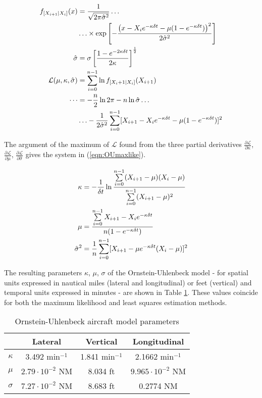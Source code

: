 \documentclass[conference]{IEEEtran}
\begin{document}
\begin{align}
f_{[X_{i+1}|X_i]}(x)&=\frac{1}{\sqrt{2\pi\hat{\sigma}^2}}\ldots\notag\\
&\ldots\times\exp\left[-\frac{\left(x-X_i e^{-\kappa\delta t}-\mu(1-e^{-\kappa\delta t})\right)^2}{2\hat{\sigma}^2} \right]\label{eqn:OUcondprob}\\
\hat{\sigma}&=\sigma\left[\frac{1-e^{-2\kappa\delta t}}{2\kappa}\right]^{\frac{1}{2}}\notag\\
\mathcal L(\mu,\kappa,\hat{\sigma})&=\sum\limits_{i=0}^{n-1} \ln f_{[X_i+1|X_{i}]}(X_{i+1})\notag \\
\cdots&=-\frac{n}{2}\ln 2\pi - n\ln\hat{\sigma}\ldots\notag\\
&\ldots-\frac{1}{2\hat{\sigma}^2}\sum\limits_{i=0}^{n-1} [X_{i+1}-X_i e^{-\kappa\delta t}-\mu(1-e^{-\kappa\delta t})]^2 \label{eqn:OUloglike}
\end{align}

The argument of the maximum of $\mathcal L$ found from the three partial derivatives $\frac{\partial\mathcal L}{\partial \kappa}$, $\frac{\partial\mathcal L}{\partial \mu}$, $\frac{\partial\mathcal L}{\partial \hat{\sigma}}$ gives the system in (\ref{eqn:OUmaxlike}).

\begin{align}
\kappa&=-\frac{1}{\delta t}\ln\frac{\sum\limits_{i=0}^{n-1}(X_{i+1}-\mu)(X_i-\mu)}{\sum\limits_{i=0}^{n-1}(X_{i+1}-\mu)^2}\notag \\
\mu&=\frac{\sum\limits_{i=0}^{n-1} X_{i+1}-X_i e^{-\kappa\delta t}}{n(1-e^{-\kappa\delta t})}\notag\\
\hat{\sigma}^2&=\frac{1}{n}\sum\limits_{i=0}^{n-1}[X_{i+1}-\mu e^{-\kappa\delta t}(X_i-\mu)]^2 \label{eqn:OUmaxlike}
\end{align}

The resulting parameters $\kappa$, $\mu$, $\sigma$ of the Ornstein-Uhlenbeck model - for spatial units expressed in nautical miles (lateral and longitudinal) or feet (vertical) and temporal units expressed in minutes - are shown in Table \ref{tab:OUparam}. These values coincide for both the maximum likelihood and least squares estimation methods.

\begin{table}
\caption{Ornstein-Uhlenbeck aircraft model parameters}
\label{tab:OUparam}
\centering
\begin{tabular}{|c|c|c|c|}
\hline\hline
&Lateral&Vertical&Longitudinal \bigstrut\\ \hline\hline
$\kappa$ & 3.492 min$^{-1}$& 1.841 min$^{-1}$&2.1662 min$^{-1}$ \bigstrut \\ \hline
$\mu$ & $2.79\cdot 10^{-2}$ NM & 8.034 ft& $9.965\cdot 10^{-2}$ NM \bigstrut \\ \hline
$\sigma$ & $7.27\cdot 10^{-2}$ NM& 8.683 ft& 0.2774 NM \bigstrut\\ \hline \hline
\end{tabular}
\end{table}
\end{document}
